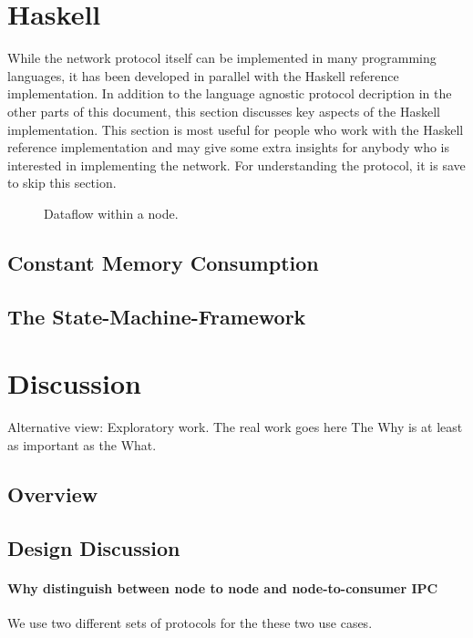 \documentclass{report}
\theoremstyle{definition}{
  \newtheorem{lemma}{Lemma}[section] %
  \newtheorem{definition}[lemma]{Definition}
}
\theoremstyle{theorem}{
  \newtheorem{invariant}[lemma]{Invariant}
  \newtheorem{proofobligation}[lemma]{Proof Obligation}
}
\numberwithin{equation}{lemma}
\begin{document}
\chapter{Haskell}
While the network protocol itself can be implemented in many programming languages,
it has been developed in parallel with the Haskell reference implementation.
In addition to the language agnostic protocol decription in the other parts of this document,
this section discusses key aspects of the Haskell implementation.
This section is most useful for people who work with the Haskell reference implementation and
may give some extra insights for anybody who is interested in implementing the network.
For understanding the protocol, it is save to skip this section.
\begin{figure}
\begin{center}
\end{center}
\caption{Dataflow within a node.}
\label{node-diagram-concurency}
\end{figure}
\section{Constant Memory Consumption}
\section{The State-Machine-Framework}
\label{Haskell-state-machine}

\chapter{Discussion}
Alternative view: Exploratory work.
The real work goes here
The Why is at least as important as the What.
\section{Overview}
\section{Design Discussion}
\subsubsection{Why distinguish between node to node and node-to-consumer IPC}
\label{why_distinguish_protocols}
We use two different sets of protocols for the these two use cases.
\end{document}

